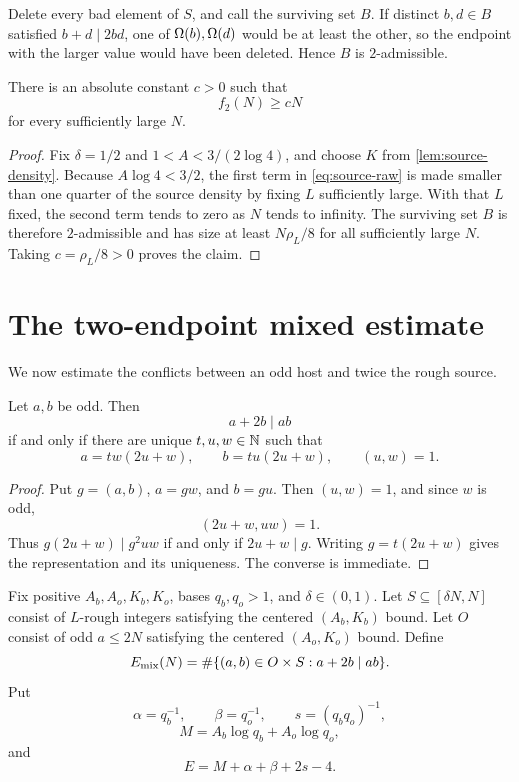 \documentclass[11pt]{article}
\begin{document}
Delete every bad element of \(S\), and call the surviving set \(B\). If
distinct \(b,d\in B\) satisfied \(b+d\mid2bd\), one of
\(\Omega(b),\Omega(d)\) would be at least the other, so the endpoint with the
larger value would have been deleted. Hence \(B\) is \(2\)-admissible.

\begin{corollary}\label{cor:second-conclusion}
There is an absolute constant \(c>0\) such that
\[
 f_2(N)\geq cN
\]
for every sufficiently large \(N\).
\end{corollary}

\begin{proof}
Fix \(\delta=1/2\) and \(1<A<3/(2\log4)\), and choose \(K\) from
\cref{lem:source-density}. Because \(A\log4<3/2\), the first term in
\eqref{eq:source-raw} is made smaller than one quarter of the source density
by fixing \(L\) sufficiently large. With that \(L\) fixed, the second term
tends to zero as \(N\) tends to infinity. The surviving set \(B\) is therefore
\(2\)-admissible and has size at least \(N\rho_L/8\) for all sufficiently
large \(N\). Taking \(c=\rho_L/8>0\) proves the claim.
\end{proof}

\section{The two-endpoint mixed estimate}\label{sec:mixed}

We now estimate the conflicts between an odd host and twice the rough source.

\begin{lemma}\label{lem:mixed-coordinates}
Let \(a,b\) be odd. Then
\[
 a+2b\mid ab
\]
if and only if there are unique \(t,u,w\in\mathbb N\) such that
\[
 a=tw(2u+w),\qquad b=tu(2u+w),\qquad (u,w)=1.
\]
\end{lemma}

\begin{proof}
Put \(g=(a,b)\), \(a=gw\), and \(b=gu\). Then \((u,w)=1\), and since \(w\)
is odd,
\[
 (2u+w,uw)=1.
\]
Thus \(g(2u+w)\mid g^2uw\) if and only if \(2u+w\mid g\). Writing
\(g=t(2u+w)\) gives the representation and its uniqueness. The converse is
immediate.
\end{proof}

Fix positive \(A_b,A_o,K_b,K_o\), bases \(q_b,q_o>1\), and
\(\delta\in(0,1)\). Let \(S\subseteq[\delta N,N]\) consist of \(L\)-rough
integers satisfying the centered \((A_b,K_b)\) bound. Let \(O\) consist of
odd \(a\leq2N\) satisfying the centered \((A_o,K_o)\) bound. Define
\[
 E_{\rm mix}(N)=
 \#\{(a,b)\in O\times S:a+2b\mid ab\}.
\]
Put
\[
 \alpha=q_b^{-1},\qquad
 \beta=q_o^{-1},\qquad
 s=(q_bq_o)^{-1},
\]
\[
 M=A_b\log q_b+A_o\log q_o,
\]
and
\[
 E=M+\alpha+\beta+2s-4.
\]
\end{document}
